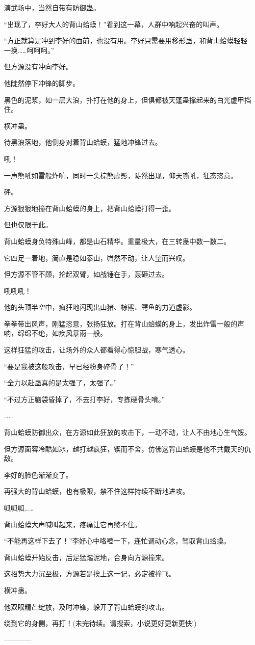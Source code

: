 \begin{this_body}
演武场中，当然自带有防御蛊。

“出现了，李好大人的背山蛤蟆！”看到这一幕，人群中响起兴奋的叫声。

“方正就算是冲到李好的面前，也没有用。李好只需要用移形蛊，和背山蛤蟆轻轻一换……呵呵呵。”

但方源没有冲向李好。

他陡然停下冲锋的脚步。

黑色的泥浆，如一层大浪，扑打在他的身上，但俱都被天蓬蛊撑起来的白光虚甲挡住。

横冲蛊。

待黑浪落地，他侧身对着背山蛤蟆，猛地冲锋过去。

吼！

一声熊吼如雷般炸响，同时一头棕熊虚影，陡然出现，仰天嘶吼，狂态恣意。

砰。

方源狠狠地撞在背山蛤蟆的身上，把背山蛤蟆打得一歪。

但也仅限于此。

背山蛤蟆身负特殊山峰，都是山石精华。重量极大，在三转蛊中数一数二。

它四足一着地，简直是稳如泰山，岿然不动，让人望而兴叹。

但方源不管不顾，抡起双臂，如战锤在手，轰砸过去。

吼吼吼！

他的头顶半空中，疯狂地闪现出山猪、棕熊、鳄鱼的力道虚影。

拳拳带出风声，刚猛恣意，张扬狂放。打在背山蛤蟆的身上，发出炸雷一般的声响，绵绵不绝，如疾风暴雨一般。

这样狂猛的攻击，让场外的众人都看得心惊胆战，寒气透心。

“要是我被这般攻击，早已经粉身碎骨了！”

“全力以赴蛊真的是太强了，太强了。”

“不过方正脑袋昏掉了，不去打李好，专拣硬骨头啃。”

……

背山蛤蟆防御出众，在方源如此狂放的攻击下，一动不动，让人不由地心生气馁。

但方源面容冷酷如冰，越打越疯狂，锲而不舍，仿佛这背山蛤蟆是他不共戴天的仇敌。

李好的脸色渐渐变了。

再强大的背山蛤蟆，也有极限，禁不住这样持续不断地进攻。

呱呱呱……

背山蛤蟆大声喊叫起来，疼痛让它再憋不住。

“不能再这样下去了！”李好心中咯噔一下，连忙调动心念，驾驭背山蛤蟆。

背山蛤蟆开始反击，后足猛踏泥地，合身向方源撞来。

这招势大力沉至极，方源若是挨上这一记，必定被撞飞。

横冲蛊。

他双眼精芒绽放，及时冲锋，躲开了背山蛤蟆的攻击。

绕到它的身侧，再打！(未完待续。请搜索，小说更好更新更快!)

------------

\end{this_body}

